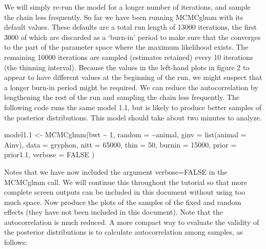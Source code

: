 \documentclass[
  12pt,
]{book}
\newenvironment{Shaded}{\begin{snugshade}}{\end{snugshade}}
\newcommand{\AttributeTok}[1]{\textcolor[rgb]{0.77,0.63,0.00}{#1}}
\newcommand{\ConstantTok}[1]{\textcolor[rgb]{0.00,0.00,0.00}{#1}}
\newcommand{\DecValTok}[1]{\textcolor[rgb]{0.00,0.00,0.81}{#1}}
\newcommand{\FloatTok}[1]{\textcolor[rgb]{0.00,0.00,0.81}{#1}}
\newcommand{\FunctionTok}[1]{\textcolor[rgb]{0.00,0.00,0.00}{#1}}
\newcommand{\NormalTok}[1]{#1}
\newcommand{\OtherTok}[1]{\textcolor[rgb]{0.56,0.35,0.01}{#1}}
\newcommand{\SpecialCharTok}[1]{\textcolor[rgb]{0.00,0.00,0.00}{#1}}
\begin{document}
We will simply re-run the model for a longer number of iterations, and sample the chain less frequently. So far we have been running MCMCglmm with its default values. These defaults are a total run length of 13000 iterations, the first 3000 of which are discarded as a `burn-in' period to make sure that the converges to the part of the parameter space where the maximum likelihood exists. The remaining 10000 iterations are sampled (estimates retained) every 10 iterations (the thinning interval). Because the values in the left-hand plots in figure 2 to appear to have different values at the beginning of the run, we might suspect that a longer burn-in period might be required. We can reduce the autocorrelation by lengthening the rest of the run and sampling the chain less frequently. The following code runs the same model 1.1, but is likely to produce better samples of the posterior distributions. This model should take about two minutes to analyze.

\begin{Shaded}
\begin{Highlighting}[]
\NormalTok{model1}\FloatTok{.1} \OtherTok{\textless{}{-}} \FunctionTok{MCMCglmm}\NormalTok{(bwt }\SpecialCharTok{\textasciitilde{}} \DecValTok{1}\NormalTok{,}
  \AttributeTok{random =} \SpecialCharTok{\textasciitilde{}}\NormalTok{animal, }\AttributeTok{ginv =} \FunctionTok{list}\NormalTok{(}\AttributeTok{animal =}\NormalTok{ Ainv),}
  \AttributeTok{data =}\NormalTok{ gryphon, }\AttributeTok{nitt =} \DecValTok{65000}\NormalTok{, }\AttributeTok{thin =} \DecValTok{50}\NormalTok{, }\AttributeTok{burnin =} \DecValTok{15000}\NormalTok{,}
  \AttributeTok{prior =}\NormalTok{ prior1}\FloatTok{.1}\NormalTok{, }\AttributeTok{verbose =} \ConstantTok{FALSE}
\NormalTok{)}
\end{Highlighting}
\end{Shaded}

Notes that we have now included the argument verbose=FALSE in the MCMCglmm call. We will continue this throughout the tutorial so that more complete screen outputs can be included in this document without using too much space. Now produce the plots of the samples of the fixed and random effects (they have not been included in this document). Note that the autocorrelation is much reduced. A more compact way to evaluate the validity of the posterior distributions is to calculate autocorrelation among samples, as follows:

\begin{Shaded}
\end{Shaded}
\end{document}
